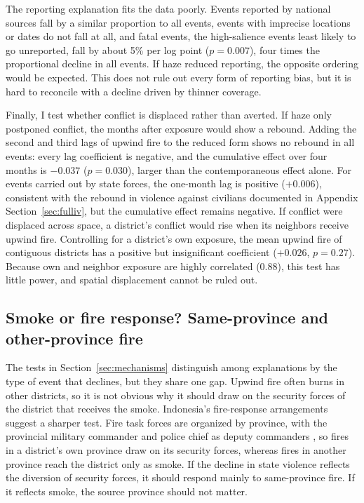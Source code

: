 \documentclass[12pt]{article}
\begin{document}
The reporting explanation fits the data poorly. Events reported by national sources fall by a similar proportion to all events, events with imprecise locations or dates do not fall at all, and fatal events, the high-salience events least likely to go unreported, fall by about 5\% per log point ($p=0.007$), four times the proportional decline in all events. If haze reduced reporting, the opposite ordering would be expected. This does not rule out every form of reporting bias, but it is hard to reconcile with a decline driven by thinner coverage.

Finally, I test whether conflict is displaced rather than averted. If haze only postponed conflict, the months after exposure would show a rebound. Adding the second and third lags of upwind fire to the reduced form shows no rebound in all events: every lag coefficient is negative, and the cumulative effect over four months is $-0.037$ ($p=0.030$), larger than the contemporaneous effect alone. For events carried out by state forces, the one-month lag is positive ($+0.006$), consistent with the rebound in violence against civilians documented in Appendix Section~\ref{sec:fulliv}, but the cumulative effect remains negative. If conflict were displaced across space, a district's conflict would rise when its neighbors receive upwind fire. Controlling for a district's own exposure, the mean upwind fire of contiguous districts has a positive but insignificant coefficient ($+0.026$, $p=0.27$). Because own and neighbor exposure are highly correlated (0.88), this test has little power, and spatial displacement cannot be ruled out.

\subsection{Smoke or fire response? Same-province and other-province fire}
\label{sec:province}

The tests in Section~\ref{sec:mechanisms} distinguish among explanations by the type of event that declines, but they share one gap. Upwind fire often burns in other districts, so it is not obvious why it should draw on the security forces of the district that receives the smoke. Indonesia's fire-response arrangements suggest a sharper test. Fire task forces are organized by province, with the provincial military commander and police chief as deputy commanders \citep{inpres3_2020}, so fires in a district's own province draw on its security forces, whereas fires in another province reach the district only as smoke. If the decline in state violence reflects the diversion of security forces, it should respond mainly to same-province fire. If it reflects smoke, the source province should not matter.
\end{document}
